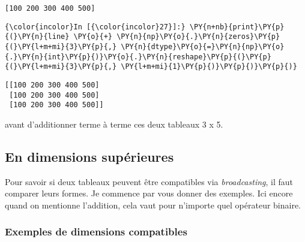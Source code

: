     \begin{Verbatim}[commandchars=\\\{\},frame=single,framerule=0.3mm,rulecolor=\color{cellframecolor}]
[100 200 300 400 500]
\end{Verbatim}

    \begin{Verbatim}[commandchars=\\\{\},frame=single,framerule=0.3mm,rulecolor=\color{cellframecolor}]
{\color{incolor}In [{\color{incolor}27}]:} \PY{n+nb}{print}\PY{p}{(}\PY{n}{line} \PY{o}{+} \PY{n}{np}\PY{o}{.}\PY{n}{zeros}\PY{p}{(}\PY{l+m+mi}{3}\PY{p}{,} \PY{n}{dtype}\PY{o}{=}\PY{n}{np}\PY{o}{.}\PY{n}{int}\PY{p}{)}\PY{o}{.}\PY{n}{reshape}\PY{p}{(}\PY{p}{(}\PY{l+m+mi}{3}\PY{p}{,} \PY{l+m+mi}{1}\PY{p}{)}\PY{p}{)}\PY{p}{)}
\end{Verbatim}


    \begin{Verbatim}[commandchars=\\\{\},frame=single,framerule=0.3mm,rulecolor=\color{cellframecolor}]
[[100 200 300 400 500]
 [100 200 300 400 500]
 [100 200 300 400 500]]
\end{Verbatim}

    avant d'additionner terme à terme ces deux tableaux 3 x 5.

    \hypertarget{en-dimensions-supuxe9rieures}{%
\subsection{En dimensions
supérieures}\label{en-dimensions-supuxe9rieures}}

    Pour savoir si deux tableaux peuvent être compatibles via
\emph{broadcasting}, il faut comparer leurs formes. Je commence par vous
donner des exemples. Ici encore quand on mentionne l'addition, cela vaut
pour n'importe quel opérateur binaire.

    \hypertarget{exemples-de-dimensions-compatibles}{%
\subsubsection{Exemples de dimensions
compatibles}\label{exemples-de-dimensions-compatibles}}

    \begin{Shaded}
\begin{Highlighting}[frame=lines,framerule=0.6mm,rulecolor=\color{asisframecolor}]
\OperatorTok{+}
\end{Highlighting}
\end{Shaded}

